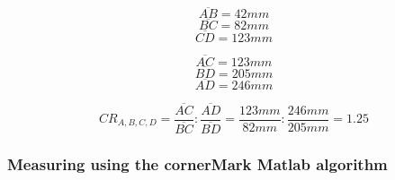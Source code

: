 \documentclass[
a4paper,     %
12pt         %
]{scrartcl}  %
\begin{document}
\begin{minipage}{0.48\textwidth}
  $$\overline{AB} = 42mm$$
  $$\overline{BC} = 82mm$$
  $$\overline{CD} = 123mm$$
\end{minipage}
\begin{minipage}{0.48\textwidth}
  $$\overline{AC} = 123mm$$
  $$\overline{BD} = 205mm$$
  $$\overline{AD} = 246mm$$
\end{minipage}

\hspace{0.5mm}

$$CR_{A,B,C,D} = \frac{\overline{AC}}{\overline{BC}} : \frac{\overline{AD}}{\overline{BD}} = \frac{123mm}{82mm} : \frac{246mm}{205mm} = 1.25$$

\subsubsection{Measuring using the cornerMark Matlab algorithm}





% 

% 
\end{document}
